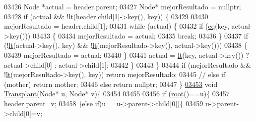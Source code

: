 \begin{DoxyCode}
03426             Node *actual = header.parent;
03427             Node* mejorResultado = \textcolor{keyword}{nullptr};
03428             \textcolor{keywordflow}{if} (actual && !\hyperlink{classaed2_1_1map_a0e5be36fae0693e4665bd2a615e7550a_a0e5be36fae0693e4665bd2a615e7550a}{lt}(header.child[1]->key(), key)) \{
03429 
03430                 mejorResultado = header.child[1];
03431                 \textcolor{keywordflow}{while} (actual) \{
03432                     \textcolor{keywordflow}{if} (\hyperlink{classaed2_1_1map_ab45cb28bb215cd229383d88b96b3f624_ab45cb28bb215cd229383d88b96b3f624}{eq}(key, actual->key()))
03433                     \{
03434                         mejorResultado = actual;
03435                         \textcolor{keywordflow}{break};
03436                     \}
03437                     \textcolor{keywordflow}{if} (!\hyperlink{classaed2_1_1map_a0e5be36fae0693e4665bd2a615e7550a_a0e5be36fae0693e4665bd2a615e7550a}{lt}(actual->key(), key) && !\hyperlink{classaed2_1_1map_a0e5be36fae0693e4665bd2a615e7550a_a0e5be36fae0693e4665bd2a615e7550a}{lt}(mejorResultado->key(), actual->key()))
03438                     \{
03439                         mejorResultado = actual;
03440                     \}
03441                     actual = \hyperlink{classaed2_1_1map_a0e5be36fae0693e4665bd2a615e7550a_a0e5be36fae0693e4665bd2a615e7550a}{lt}(key, actual->key()) ? actual->child[0] : actual->child[1];
03442                 \}
03443             \}
03444             \textcolor{keywordflow}{if} (mejorResultado && !\hyperlink{classaed2_1_1map_a0e5be36fae0693e4665bd2a615e7550a_a0e5be36fae0693e4665bd2a615e7550a}{lt}(mejorResultado->key(), key)) \textcolor{keywordflow}{return} mejorResultado;
03445            \textcolor{comment}{// else if (mother) return mother;}
03446             \textcolor{keywordflow}{else} \textcolor{keywordflow}{return} \textcolor{keyword}{nullptr};
03447         \}
\hypertarget{map_8h_source.tex_l03453}{}\hyperlink{classaed2_1_1map_a6c9fb4a85c0e8d2de5dcbdbc0d695be5_a6c9fb4a85c0e8d2de5dcbdbc0d695be5}{03453}               \textcolor{keywordtype}{void} \hyperlink{classaed2_1_1map_a6c9fb4a85c0e8d2de5dcbdbc0d695be5_a6c9fb4a85c0e8d2de5dcbdbc0d695be5}{Transplant}(Node* u, Node* v)\{
03454 
03455 
03456                   \textcolor{keywordflow}{if} (\hyperlink{classaed2_1_1map_a07ab50eda249a57858a34037d4c4c7b2_a07ab50eda249a57858a34037d4c4c7b2}{root}()==u)\{
03457                       header.parent=v;
03458                   \}\textcolor{keywordflow}{else} \textcolor{keywordflow}{if}(u==u->parent->child[0])\{
03459                       u->parent->child[0]=v;

\end{DoxyCode}
